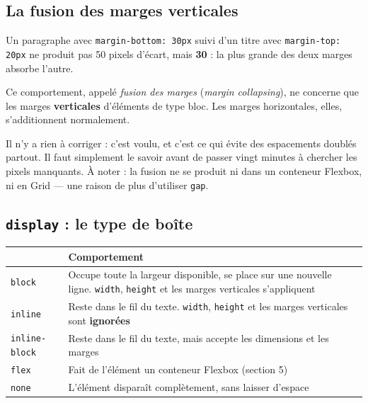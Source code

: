 \documentclass[a4paper,11pt]{article}
\newcommand{\hdr}[1]{\multicolumn{1}{l}{\color{white}\bfseries #1}}
\renewcommand{\arraystretch}{1.3}
\begin{document}
\subsection{La fusion des marges verticales}

\begin{tcolorbox}[attention, title={Deux marges verticales qui se touchent n'en font qu'une}]
Un paragraphe avec \texttt{margin-bottom: 30px} suivi d'un titre avec \texttt{margin-top: 20px} ne produit pas 50 pixels d'écart, mais \textbf{30} : la plus grande des deux marges absorbe l'autre.

\vspace{4pt}
Ce comportement, appelé \textit{fusion des marges} (\textit{margin collapsing}), ne concerne que les marges \textbf{verticales} d'éléments de type bloc. Les marges horizontales, elles, s'additionnent normalement.

\vspace{4pt}
Il n'y a rien à corriger : c'est voulu, et c'est ce qui évite des espacements doublés partout. Il faut simplement le savoir avant de passer vingt minutes à chercher les pixels manquants. À noter : la fusion ne se produit ni dans un conteneur Flexbox, ni en Grid --- une raison de plus d'utiliser \texttt{gap}.
\end{tcolorbox}

\subsection{\texttt{display} : le type de boîte}

\begin{center}
\renewcommand{\arraystretch}{1.0}
\begin{tabularx}{\linewidth}{p{2.8cm}X}
  \toprule
  \rowcolor{uniNavy}
  \hdr{Valeur} & \hdr{Comportement} \\
  \midrule
  \rowcolor{uniPaper}
  \texttt{block} & Occupe toute la largeur disponible, se place sur une nouvelle ligne. \texttt{width}, \texttt{height} et les marges verticales s'appliquent \\
  \texttt{inline} & Reste dans le fil du texte. \texttt{width}, \texttt{height} et les marges verticales sont \textbf{ignorées} \\
  \rowcolor{uniPaper}
  \texttt{inline-block} & Reste dans le fil du texte, mais accepte les dimensions et les marges \\
  \texttt{flex} & Fait de l'élément un conteneur Flexbox (section 5) \\
  \rowcolor{uniPaper}
  \texttt{none} & L'élément disparaît complètement, sans laisser d'espace \\
  \bottomrule
\end{tabularx}
\end{center}
\end{document}
